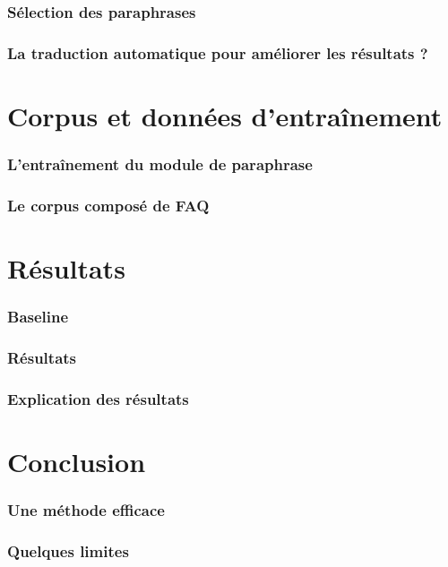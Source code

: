 \documentclass[10pt]{beamer}
\begin{document}
\begin{frame}
  \frametitle{Sélection des paraphrases}
\end{frame}

\begin{frame}
  \frametitle{La traduction automatique pour améliorer les résultats
    ?}
\end{frame}

\section{Corpus et données d'entraînement}
\label{sec:corpus}

\begin{frame}
  \frametitle{L'entraînement du module de paraphrase}
\end{frame}

\begin{frame}
  \frametitle{Le corpus composé de FAQ}
\end{frame}


\section{Résultats}
\label{sec:results}


\begin{frame}
  \frametitle{Baseline}
\end{frame}

\begin{frame}
  \frametitle{Résultats}
\end{frame}

\begin{frame}
  \frametitle{Explication des résultats}
\end{frame}

\section{Conclusion}
\label{sec:conclusion}


\begin{frame}
  \frametitle{Une méthode efficace}
\end{frame}

\begin{frame}
  \frametitle{Quelques limites}
\end{frame}
\end{document}
